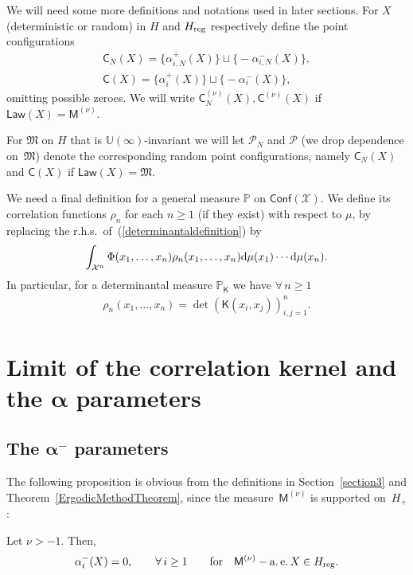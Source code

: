 We will need some more definitions and notations used in later sections. For $X$ (deterministic or random) in $H$ and $H_{{\rm reg}}$ respectively define the point configurations
\begin{gather*}
\mathsf{C}_N(X) =\big\{\alpha_{i,N}^{+}(X)\big\} \sqcup \big\{{-}\alpha_{i,N}^{-}(X)\big\}, \\
\mathsf{C}(X) =\big\{\alpha_{i}^{+}(X)\big\} \sqcup \big\{{-}\alpha_{i}^{-}(X)\big\},
\end{gather*}
omitting possible zeroes. We will write $\mathsf{C}^{(\nu)}_N(X), \mathsf{C}^{(\nu)}(X)$ if $\mathsf{Law}(X)=\mathsf{M}^{(\nu)}$.

For $\mathfrak{M}$ on $H$ that is $\mathbb{U}(\infty)$-invariant we will let $\mathcal{P}_N$ and $\mathcal{P}$ (we drop dependence on~$\mathfrak{M}$) denote the corresponding random point configurations, namely $\mathsf{C}_N(X)$ and $\mathsf{C}(X)$ if $\mathsf{Law}(X)=\mathfrak{M}$.


We need a final definition for a general measure $\mathbb{P}$ on $\mathsf{Conf}(\mathcal{X})$. We define its correlation functions $\rho_n$ for each $n\ge 1$ (if they exist) with respect to $\mu$, by replacing the r.h.s.\ of~(\ref{determinantaldefinition}) by
\begin{gather*}
\int_{\mathcal{X}^n}^{}\Phi(x_1,\dots,x_n) \rho_n(x_1,\dots,x_n){\rm d}\mu(x_1) \cdots {\rm d}\mu(x_n).
\end{gather*}
In particular, for a determinantal measure $\mathbb{P}_{\mathsf{K}}$ we have $\forall\, n \ge 1$
\begin{gather*}
\rho_n(x_1,\dots,x_n)=\det (\mathsf{K}(x_i,x_j) )_{i,j=1}^n.
\end{gather*}

\section[Limit of the correlation kernel and the $\alpha$ parameters]{Limit of the correlation kernel and the $\boldsymbol{\alpha}$ parameters}\label{section4}
\subsection[The $\alpha^-$ parameters]{The $\boldsymbol{\alpha^-}$ parameters}\label{section4.1}
The following proposition is obvious from the definitions in Section~\ref{section3} and Theorem~\ref{ErgodicMethodTheorem}, since the measure~$\mathsf{M}^{(\nu)}$ is supported on~$H_+$:
\begin{Proposition}\label{PropositionAlphaMinus}
Let $\nu>-1$. Then,
\begin{gather*}
\alpha_i^-(X)=0,\qquad \forall\, i\ge 1 \qquad \text{for} \quad \mathsf{M}^{(\nu)}-\operatorname{a.e.} X \in H_{{\rm reg}}.
\end{gather*}
\end{Proposition}

